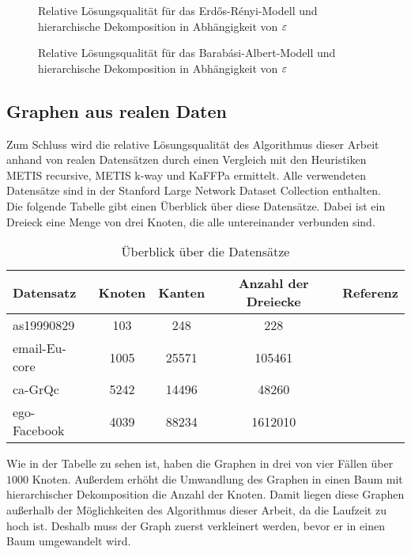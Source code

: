 \begin{figure}[H]
    \centering
    
    \caption{Relative Lösungsqualität für das Erdős-Rényi-Modell und hierarchische Dekomposition in Abhängigkeit von $\varepsilon$\label{fig:edgeprobhdecompimb}}
\end{figure}

\begin{figure}[H]
    \centering
    
    \caption{Relative Lösungsqualität für das Barabási-Albert-Modell und hierarchische Dekomposition in Abhängigkeit von $\varepsilon$\label{fig:prefattachhdecompimb}}
\end{figure}

\subsection{Graphen aus realen Daten}
Zum Schluss wird die relative Lösungsqualität des Algorithmus dieser Arbeit anhand von realen Datensätzen durch einen Vergleich mit den Heuristiken METIS recursive, METIS k-way und KaFFPa ermittelt.
Alle verwendeten Datensätze sind in der Stanford Large Network Dataset Collection enthalten.~\cite{LK14}
Die folgende Tabelle gibt einen Überblick über diese Datensätze.
Dabei ist ein Dreieck eine Menge von drei Knoten, die alle untereinander verbunden sind.

\begin{table}[H]
    \centering
    \begin{tabular}{lcccc}
        \toprule
        Datensatz & Knoten & Kanten & Anzahl der Dreiecke & Referenz \\
        \midrule
        as19990829 & 103 & 248 & 228 & \cite{LKF05} \\
        email-Eu-core & 1005 & 25571 & 105461 & \cite{LKF07} \\
        ca-GrQc & 5242 & 14496 & 48260 & \cite{LKF07} \\
        ego-Facebook & 4039 & 88234 & 1612010 & \cite{ML14} \\
        \bottomrule
    \end{tabular}
    \caption{Überblick über die Datensätze}
\end{table}

Wie in der Tabelle zu sehen ist, haben die Graphen in drei von vier Fällen über $1000$ Knoten.
Außerdem erhöht die Umwandlung des Graphen in einen Baum mit hierarchischer Dekomposition die Anzahl der Knoten. 
Damit liegen diese Graphen außerhalb der Möglichkeiten des Algorithmus dieser Arbeit, da die Laufzeit zu hoch ist.
Deshalb muss der Graph zuerst verkleinert werden, bevor er in einen Baum umgewandelt wird.


